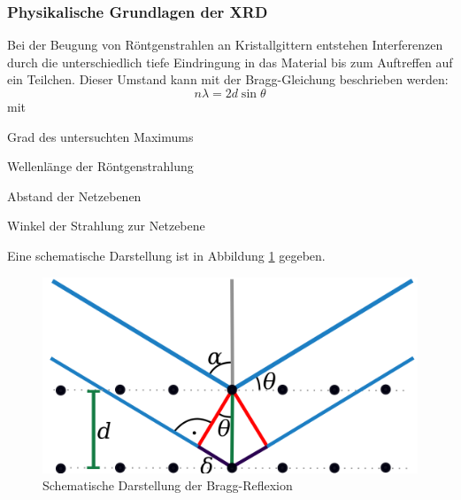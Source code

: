 \documentclass[a4paper, 11pt, headsepline,footsepline,twoside,abstract]{scrbook}
\begin{document}
\subsubsection{Physikalische Grundlagen der XRD}
Bei der Beugung von Röntgenstrahlen an Kristallgittern entstehen Interferenzen durch die unterschiedlich tiefe Eindringung in das Material bis zum Auftreffen auf ein Teilchen. Dieser Umstand kann mit der Bragg-Gleichung beschrieben werden:
\begin{equation}
n\lambda = 2d \sin{\theta}
\end{equation}
mit
\begin{description}\itemsep0pt
\item[n] Grad des untersuchten Maximums
\item[$\boldsymbol{\lambda}$] Wellenlänge der Röntgenstrahlung
\item[d] Abstand der Netzebenen
\item[$\boldsymbol{\theta}$] Winkel der Strahlung zur Netzebene
\end{description}
Eine schematische Darstellung ist in Abbildung \ref{bragg} gegeben.
\begin{figure}
	\centering
	\includegraphics[width=0.6\columnwidth]{images/Bragg.png}
	\caption{Schematische Darstellung der Bragg-Reflexion \cite{wiki_bragg}}
	\label{bragg}
\end{figure}
\end{document}
